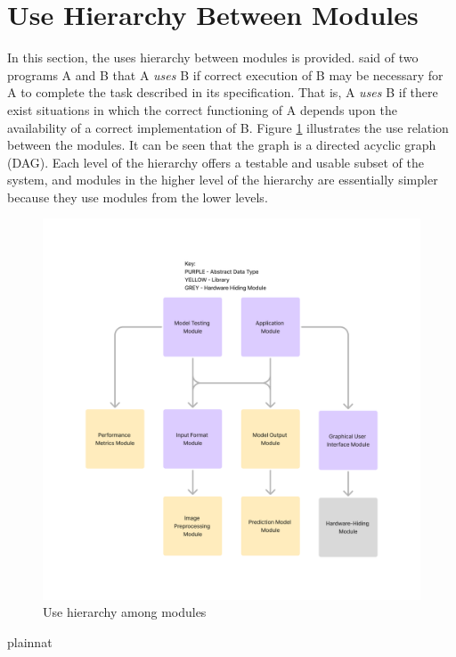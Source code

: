 \documentclass[12pt, titlepage]{article}
\begin{document}
\section{Use Hierarchy Between Modules} \label{SecUse}

In this section, the uses hierarchy between modules is
provided. \citet{Parnas1978} said of two programs A and B that A {\em uses} B if
correct execution of B may be necessary for A to complete the task described in
its specification. That is, A {\em uses} B if there exist situations in which
the correct functioning of A depends upon the availability of a correct
implementation of B.  Figure \ref{FigUH} illustrates the use relation between
the modules. It can be seen that the graph is a directed acyclic graph
(DAG). Each level of the hierarchy offers a testable and usable subset of the
system, and modules in the higher level of the hierarchy are essentially simpler
because they use modules from the lower levels.



\begin{figure}[H]
\centering
\includegraphics[width=1\textwidth]{UsesHierarchy.png}
\caption{Use hierarchy among modules}
\label{FigUH}
\end{figure}

 {plainnat}


\newpage{}
\end{document}
